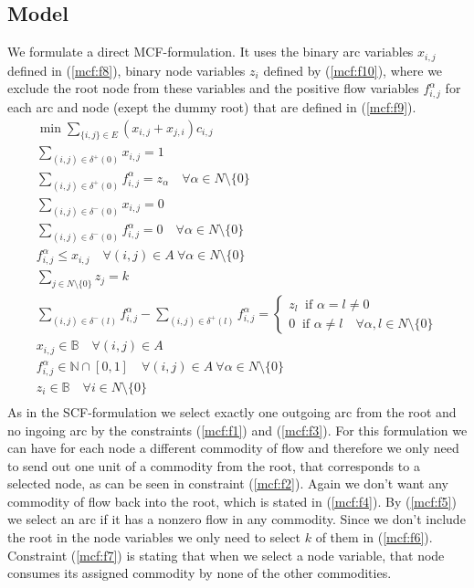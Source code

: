 \documentclass[11pt]{article}
\begin{document}
\subsection{Model}
We formulate a direct MCF-formulation. It uses the binary arc variables $x_{i,j}$ defined in (\ref{mcf:f8}), binary node variables $z_i$ defined by (\ref{mcf:f10}), where we exclude the root node from these variables and the positive flow variables $f_{i,j}^\alpha$ for each arc and node (exept the dummy root) that are defined in (\ref{mcf:f9}).
\begin{gather}
  \min\sum\limits_{\{i,j\}\in E}(x_{i,j}+ x_{j,i})c_{i,j} \label{mcf:f0}\\
  \sum\limits_{(i,j)\in \delta^+(0) } x_{i,j} =1 \label{mcf:f1}\\
  \sum\limits_{(i,j)\in \delta^+(0) } f_{i,j}^\alpha =z_\alpha \quad \forall \alpha\in N \setminus \{0\} \label{mcf:f2}\\
  \sum\limits_{(i,j)\in \delta^-(0) } x_{i,j} =0 \label{mcf:f3}\\
  \sum\limits_{(i,j)\in \delta^-(0) } f_{i,j}^\alpha =0 \quad \forall \alpha \in N \setminus \{0\} \label{mcf:f4}\\
  f_{i,j}^\alpha \leq x_{i,j} \quad \forall (i,j)\in A \ \forall \alpha \in N\setminus\{0\}\label{mcf:f5}\\
  \sum\limits_{j\in N\setminus \{0\}} z_j = k\label{mcf:f6}\\
  \sum\limits_{(i,j)\in \delta^-(l) } f_{i,j}^\alpha - \sum\limits_{(i,j)\in \delta^+(l) } f_{i,j}^\alpha = 
  \begin{cases} z_l \ \text{ if } \alpha = l \neq 0 \\ 0 \ \text{ if } \alpha \neq l \quad \forall \alpha, l \in N \setminus \{0\} \end{cases} \label{mcf:f7}\\
  x_{i,j} \in \mathbb{B} \quad \forall (i,j)\in A\label{mcf:f8}\\
  f_{i,j}^\alpha \in \mathbb{N}\cap[0,1] \quad \forall (i,j)\in A \ \forall \alpha \in N \setminus \{0\}\label{mcf:f9}\\
  z_{i} \in \mathbb{B} \quad \forall i \in N\setminus \{0\}\label{mcf:f10}\\
\end{gather}
As in the SCF-formulation we select exactly one outgoing arc from the root and no ingoing arc by the constraints (\ref{mcf:f1}) and (\ref{mcf:f3}). For this formulation we can have for each node a different commodity of flow and therefore we only need to send out one unit of a commodity from the root, that corresponds to a selected node, as can be seen in constraint (\ref{mcf:f2}). Again we don't want any commodity of flow back into the root, which is stated in (\ref{mcf:f4}).
By (\ref{mcf:f5}) we select an arc if it has a nonzero flow in any commodity. Since we don't include the root in the node variables we only need to select $k$ of them in (\ref{mcf:f6}). Constraint (\ref{mcf:f7}) is stating that when we select a node variable, that node consumes its assigned commodity by none of the other commodities.
\end{document}
